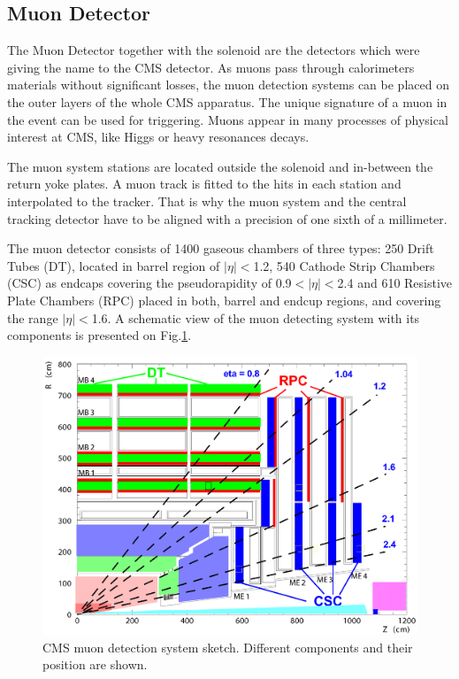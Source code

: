 \subsection{Muon Detector}\label{ssec:muonDet}

The Muon Detector\cite{CMSatLHC} together with the solenoid are the detectors which were giving the name to the CMS detector. As muons pass through calorimeters materials
without significant losses\cite{MuonStop}, the muon detection systems can be placed on the outer layers of the whole CMS apparatus.
The unique signature of a muon in the event can be used for triggering. Muons appear in many processes
of physical interest at CMS, like Higgs or heavy resonances decays.

The muon system stations are located outside the solenoid and in-between the return yoke plates. A muon track is fitted to the hits in each station 
and interpolated to the tracker. That is why the muon system and the central tracking detector have to be aligned with a precision of one sixth of a millimeter.

The muon detector consists of 1400 gaseous chambers of three types: 250 Drift Tubes (DT), located in barrel region of $|\eta| < $1.2, 540 Cathode Strip Chambers
(CSC) as endcaps covering the pseudorapidity of 0.9$ < |\eta| < $2.4 and 610 Resistive Plate Chambers (RPC) placed in both, barrel and endcup regions, and covering
the range $|\eta| < $1.6. A schematic view of the muon detecting system with its components is presented on Fig.\ref{fig:muond}.

\begin{figure}[t]
  \centering
  \includegraphics[width=1.0\textwidth]{02_experimental_setup/plots/Figures_Experimental_Apparatus_MuonDetector.png}
  \caption{CMS muon detection system sketch. Different components and their position are shown.}
  \label{fig:muond}
\end{figure}

